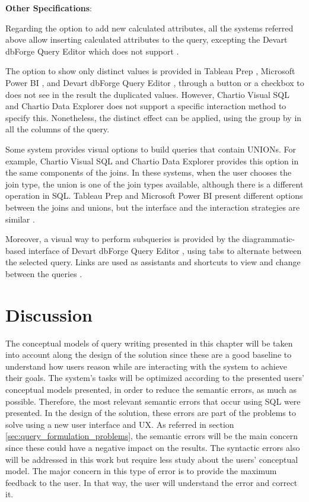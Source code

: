 \textbf{Other Specifications}: 

Regarding the option to add new calculated attributes, all the systems referred above allow inserting calculated attributes to the query, excepting the Devart dbForge Query Editor which does not support \cite{visualSqlActions,tableauCalculatedField,powerBICommonQueryTasks}.

The option to show only distinct values is provided in Tableau Prep \cite{tableauPrep}, Microsoft Power BI \cite{powerBI}, and Devart dbForge Query Editor \cite{dbForgeQueryBuilder}, through a button or a checkbox to does not see in the result the duplicated values. However, Chartio Visual SQL \cite{chartioVisualSQL} and Chartio Data Explorer \cite{chartioDataExplorer} does not support a specific interaction method to specify this. Nonetheless, the distinct effect can be applied, using the group by in all the columns of the query.

Some system provides visual options to build queries that contain UNIONs. For example, Chartio Visual SQL \cite{chartioVisualSQL} and Chartio Data Explorer \cite{chartioDataExplorer} provides this option in the same components of the joins. In these systems, when the user chooses the join type, the union is one of the join types available, although there is a different operation in \gls{SQL}. Tableau Prep \cite{tableauPrep} and Microsoft Power BI \cite{powerBI} present different options between the joins and unions, but the interface and the interaction strategies are similar \cite{tableauAggregateJoinOrUnionData,powerBIShapeAndCombineData}.

Moreover, a visual way to perform subqueries is provided by the diagrammatic-based interface of Devart dbForge Query Editor \cite{dbForgeQueryBuilder}, using tabs to alternate between the selected query. Links are used as assistants and shortcuts to view and change between the queries \cite{dbForgeSubqueriesOverview,dbForgeSubqueriesInFromClauses}.

\section{Discussion}
\label{sec:discussion}
The conceptual models of query writing presented in this chapter will be taken into account along the design of the solution since these are a good baseline to understand how users reason while are interacting with the system to achieve their goals. The system's tasks will be optimized according to the presented users' conceptual models presented, in order to reduce the semantic errors, as much as possible. Therefore, the most relevant semantic errors that occur using \gls{SQL} were presented. In the design of the solution, these errors are part of the problems to solve using a new user interface and \gls{UX}. As referred in section \ref{sec:query_formulation_problems}, the semantic errors will be the main concern since these could have a negative impact on the results. The syntactic errors also will be addressed in this work but require less study about the users’ conceptual model. The major concern in this type of error is to provide the maximum feedback to the user. In that way, the user will understand the error and correct it.

